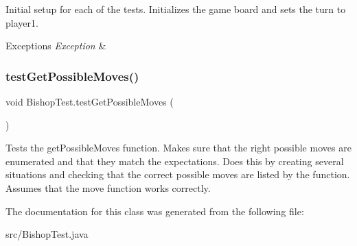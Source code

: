 Initial setup for each of the tests. Initializes the game board and sets the turn to player1. 
\begin{DoxyExceptions}{Exceptions}
{\em Exception} & \\
\hline
\end{DoxyExceptions}
\mbox{\label{class_bishop_test_a94f3b145a95a29033d1df0a4a504cd06}} 
\subsubsection{\texorpdfstring{test\+Get\+Possible\+Moves()}{testGetPossibleMoves()}}
{\footnotesize\ttfamily void Bishop\+Test.\+test\+Get\+Possible\+Moves (\begin{DoxyParamCaption}{ }\end{DoxyParamCaption})}

Tests the get\+Possible\+Moves function. Makes sure that the right possible moves are enumerated and that they match the expectations. Does this by creating several situations and checking that the correct possible moves are listed by the function. Assumes that the move function works correctly. 

The documentation for this class was generated from the following file\+:\begin{DoxyCompactItemize}
\item 
src/Bishop\+Test.\+java\end{DoxyCompactItemize}
